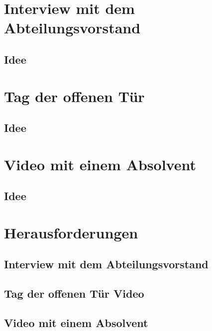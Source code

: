 \section{Interview mit dem Abteilungsvorstand}
\subsection{Idee}
 
\section{Tag der offenen Tür}
\subsection{Idee}

\section{Video mit einem Absolvent}
\subsection{Idee}

\section{Herausforderungen}
\subsection{Interview mit dem Abteilungsvorstand}
\subsection{Tag der offenen Tür Video}
\subsection{Video mit einem Absolvent}
